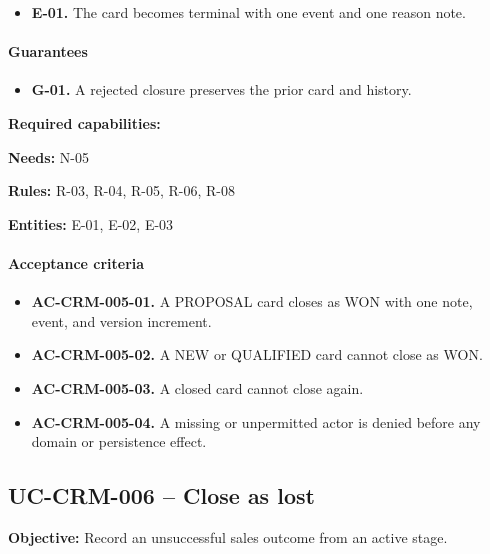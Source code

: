 \documentclass[10pt,a4paper]{article}
\begin{document}
\begin{itemize}

\item \textbf{E-01.} The card becomes terminal with one event and one reason note.

\end{itemize}

\paragraph{Guarantees}

\begin{itemize}

\item \textbf{G-01.} A rejected closure preserves the prior card and history.

\end{itemize}

\textbf{Required capabilities:}

\textbf{Needs:} N-05

\textbf{Rules:} R-03, R-04, R-05, R-06, R-08

\textbf{Entities:} E-01, E-02, E-03

\paragraph{Acceptance criteria}

\begin{itemize}

\item \textbf{AC-CRM-005-01.} A PROPOSAL card closes as WON with one note, event, and version increment.

\item \textbf{AC-CRM-005-02.} A NEW or QUALIFIED card cannot close as WON.

\item \textbf{AC-CRM-005-03.} A closed card cannot close again.

\item \textbf{AC-CRM-005-04.} A missing or unpermitted actor is denied before any domain or persistence effect.

\end{itemize}

\subsection{UC-CRM-006 -- Close as lost}

\textbf{Objective:} Record an unsuccessful sales outcome from an active stage.
\end{document}
